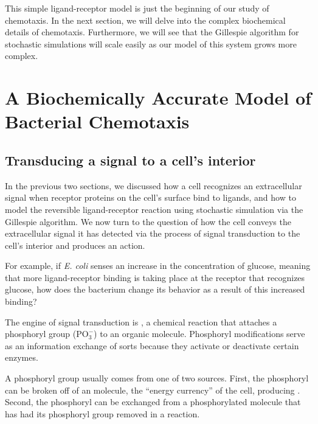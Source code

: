 This simple ligand-receptor model is just the beginning of our study of chemotaxis. In the next section, we will delve into the complex biochemical details of chemotaxis. Furthermore, we will see that the Gillespie algorithm for stochastic simulations will scale easily as our model of this system grows more complex.\\

\FloatBarrier
{}

\section{A Biochemically Accurate Model of Bacterial Chemotaxis}
\label{sec:a_biochemically_accurate_model_of_bacterial_chemotaxis}

\subsection{Transducing a signal to a cell's interior}

In the previous two sections, we discussed how a cell recognizes an extracellular signal when receptor proteins on the cell's surface bind to ligands, and how to model the reversible ligand-receptor reaction using stochastic simulation via the Gillespie algorithm. We now turn to the question of how the cell conveys the extracellular signal it has detected via the process of signal transduction to the cell's interior and produces an action.

For example, if \textit{E. coli} senses an increase in the concentration of glucose, meaning that more ligand-receptor binding is taking place at the receptor that recognizes glucose, how does the bacterium change its behavior as a result of this increased binding?

The engine of signal transduction is , a chemical reaction that attaches a phosphoryl group ($\text{PO}_3^{-}$) to an organic molecule.  Phosphoryl modifications serve as an information exchange of sorts because they activate or deactivate certain enzymes.

A phosphoryl group usually comes from one of two sources. First, the phosphoryl can be broken off of an  molecule, the ``energy currency'' of the cell, producing . Second, the phosphoryl can be exchanged from a phosphorylated molecule that has had its phosphoryl group removed in a  reaction.

